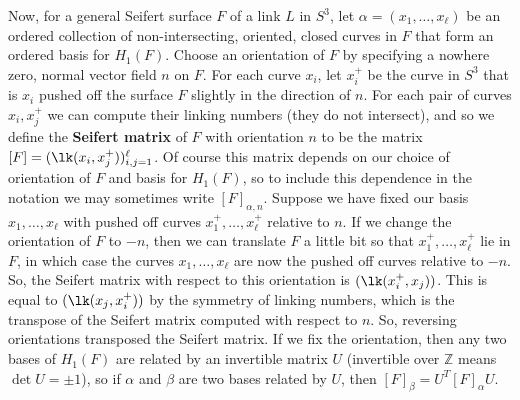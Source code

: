 Now, for a general Seifert surface $F$ of a link $L$ in $S^3$, let $\alpha=(x_1,\ldots,x_\ell)$ be an ordered collection of non-intersecting, oriented, closed curves in $F$ that form an ordered basis for $H_1(F)$. Choose an orientation of $F$ by specifying a nowhere zero, normal vector field $n$ on $F$. For each curve $x_i$, let $x_i^+$ be the curve in $S^3$ that is $x_i$ pushed off the surface $F$ slightly in the direction of $n$. For each pair of curves $x_i,x_j^+$ we can compute their linking numbers (they do not intersect), and so we define the \textbf{Seifert matrix} of $F$ with orientation $n$ to be the matrix $[F] = (\lk(x_i,x_j^+))_{i,j=1}^\ell$. Of course this matrix depends on our choice of orientation of $F$ and basis for $H_1(F)$, so to include this dependence in the notation we may sometimes write $[F]_{\alpha,n}$. Suppose we have fixed our basis $x_1,\ldots,x_\ell$ with pushed off curves $x_1^+,\ldots,x_\ell^+$ relative to $n$. If we change the orientation of $F$ to $-n$, then we can translate $F$ a little bit so that $x_1^+,\ldots,x_\ell^+$ lie in $F$, in which case the curves $x_1,\ldots,x_\ell$ are now the pushed off curves relative to $-n$. So, the Seifert matrix with respect to this orientation is $(\lk(x_i^+,x_j))$. This is equal to $(\lk(x_j,x_i^+))$ by the symmetry of linking numbers, which is the transpose of the Seifert matrix computed with respect to $n$. So, reversing orientations transposed the Seifert matrix. If we fix the orientation, then any two bases of $H_1(F)$ are related by an invertible matrix $U$ (invertible over $\mathbb Z$ means $\det U=\pm 1$), so if $\alpha$ and $\beta$ are two bases related by $U$, then $[F]_\beta = U^T [F]_\alpha U$.

